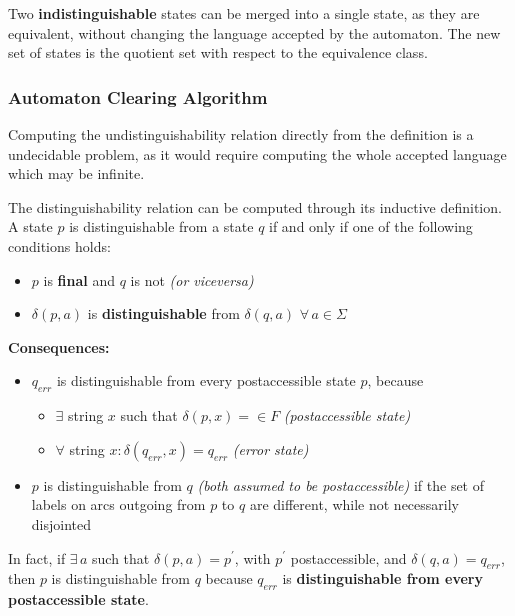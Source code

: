 \documentclass[english]{article}
\begin{document}
Two \textbf{indistinguishable} states can be merged into a single state, as they are equivalent, without changing the language accepted by the automaton.
The new set of states is the quotient set with respect to the equivalence class.

\subsubsection{Automaton Clearing Algorithm}

Computing the undistinguishability relation directly from the definition is a undecidable problem, as it would require computing the whole accepted language which may be infinite.

The distinguishability relation can be computed through its inductive definition.
A state \(p\) is distinguishable from a state \(q\) if and only if one of the following conditions holds:

\begin{itemize}
  \item \(p\) is \textbf{final} and \(q\) is not \textit{(or viceversa)}
  \item \(\delta(p, a)\) is \textbf{distinguishable} from \(\delta(q, a)\) \(\forall \, a \in \Sigma\)
\end{itemize}

\textbf{Consequences:}
\begin{itemize}[label=\(\Rightarrow\)]
  \item \(q_\textit{err}\) is distinguishable from every postaccessible state \(p\), because
        \begin{itemize}
          \item \(\exists\) string \(x\) such that \(\delta(p, x) = \in F\) \textit{(postaccessible state)}
          \item \(\forall\) string \(x: \delta(q_\textit{err}, x) = q_\textit{err}\) \textit{(error state)}
        \end{itemize}
  \item \(p\) is distinguishable from \(q\) \textit{(both assumed to be postaccessible)} if the set of labels on arcs outgoing from \(p\) to \(q\) are different, while not necessarily disjointed
\end{itemize}

In fact, if \(\exists \, a\) such that \(\delta(p, a) = p^\prime\), with \(p^\prime\) postaccessible, and \(\delta(q, a) = q_\textit{err}\), then \(p\) is distinguishable from \(q\) because \(q_\textit{err}\) is \textbf{distinguishable from every postaccessible state}.
\end{document}
